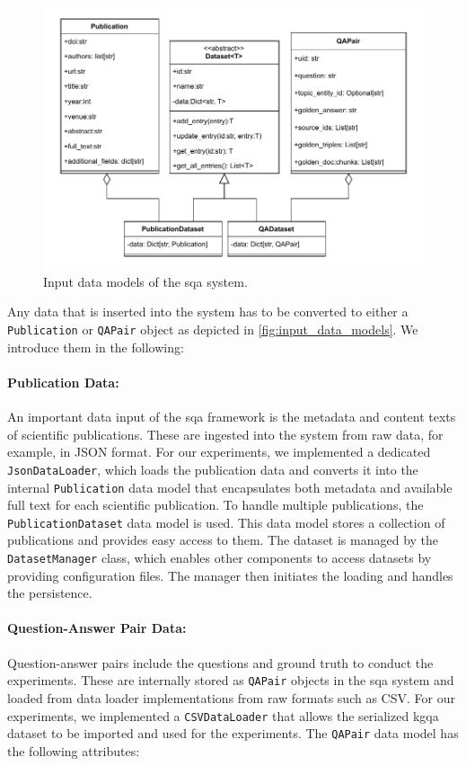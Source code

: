\begin{figure}[t]
    \centering
    \includegraphics[width=0.99\linewidth]{figures/framework/figures-Input_data_models.drawio.pdf}
    \caption[Input Data Models of the SQA System]{Input data models of the \gls{sqa} system.}
    \label{fig:input_data_models}
\end{figure}

Any data that is inserted into the system has to be converted to either a \texttt{Publication} or \texttt{QAPair} object as depicted in \autoref{fig:input_data_models}. We introduce them in the following:

\paragraph{Publication Data:} 
An important data input of the \gls{sqa} framework is the metadata and content texts of scientific publications. These are ingested into the system from raw data, for example, in JSON format. For our experiments, we implemented a dedicated \texttt{JsonDataLoader}, which loads the publication data and converts it into the internal \texttt{Publication} data model that encapsulates both metadata and available full text for each scientific publication. To handle multiple publications, the \texttt{PublicationDataset} data model is used. This data model stores a collection of publications and provides easy access to them. The dataset is managed by the \texttt{DatasetManager} class, which enables other components to access datasets by providing configuration files. The manager then initiates the loading and handles the persistence.

\paragraph{Question-Answer Pair Data:} 
Question-answer pairs include the questions and ground truth to conduct the experiments. These are internally stored as \texttt{QAPair} objects in the \gls{sqa} system and loaded from data loader implementations from raw formats such as CSV. For our experiments, we implemented a \texttt{CSVDataLoader} that allows the serialized \gls{kgqa} dataset to be imported and used for the experiments. The \texttt{QAPair} data model has the following attributes:

